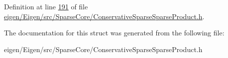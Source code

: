 Definition at line \hyperlink{eigen_2_eigen_2src_2_sparse_core_2_conservative_sparse_sparse_product_8h_source_l00191}{191} of file \hyperlink{eigen_2_eigen_2src_2_sparse_core_2_conservative_sparse_sparse_product_8h_source}{eigen/\+Eigen/src/\+Sparse\+Core/\+Conservative\+Sparse\+Sparse\+Product.\+h}.



The documentation for this struct was generated from the following file\+:\begin{DoxyCompactItemize}
\item 
eigen/\+Eigen/src/\+Sparse\+Core/\+Conservative\+Sparse\+Sparse\+Product.\+h\end{DoxyCompactItemize}
